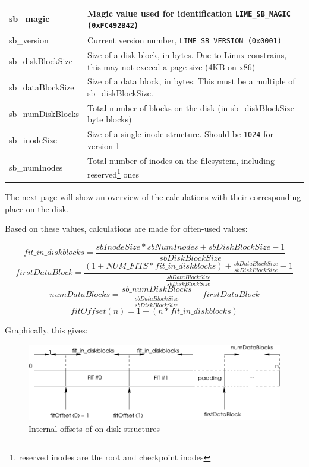 \begin{tabularx}{\textwidth}{|l|X|}
\hline
sb\_magic&Magic value used for identification \texttt{LIME\_SB\_MAGIC (0xFC492B42)}\\
\hline
sb\_version&Current version number, \texttt{LIME\_SB\_VERSION (0x0001)}\\
\hline
sb\_diskBlockSize&Size of a disk block, in bytes. Due to Linux constrains, this may not exceed a page size (4KB on x86)\\
\hline
sb\_dataBlockSize&Size of a data block, in bytes. This must be a multiple of sb\_diskBlockSize.\\
\hline
sb\_numDiskBlocks&Total number of blocks on the disk (in sb\_diskBlockSize byte blocks)\\
\hline
sb\_inodeSize&Size of a single inode structure. Should be \texttt{1024} for version 1\\
\hline
sb\_numInodes&Total number of inodes on the filesystem, including reserved\footnote{reserved inodes are the root and checkpoint inodes} ones\\
\hline
\end{tabularx}

The next page will show an overview of the calculations with their corresponding place on the disk.

\newpage

Based on these values, calculations are made for often-used values:

\begin{displaymath}
fit\_in\_diskblocks = \frac{sbInodeSize * sbNumInodes + sbDiskBlockSize - 1}{sbDiskBlockSize}
\end{displaymath}
\begin{displaymath}
firstDataBlock = \frac{(1 + NUM\_FITS * fit\_in\_diskblocks) + \frac{sbDataBlockSize}{sbDiskBlockSize} - 1}{\frac{sbDataBlockSize}{sbDiskBlockSize}}
\end{displaymath}
\begin{displaymath}
numDataBlocks = \frac{sb\_numDiskBlocks}{\frac{sbDataBlockSize}{sbDiskBlockSize}} - firstDataBlock 
\end{displaymath}
\begin{displaymath}
fitOffset(n) = 1 + (n * fit\_in\_diskblocks)
\end{displaymath}

Graphically, this gives:

\begin{figure}[h]
\includegraphics[width=12cm]{calc}
\caption{Internal offsets of on-disk structures}
\end{figure}

